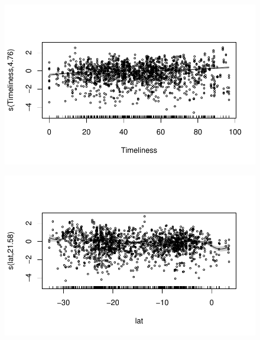 \documentclass[
  letterpaper,
  DIV=11,
  numbers=noendperiod]{scrartcl}
\begin{document}
\begin{figure}[H]

{\centering \includegraphics{Group34Coursework_files/figure-pdf/unnamed-chunk-16-8.pdf}

}

\end{figure}

\begin{figure}[H]

{\centering \includegraphics{Group34Coursework_files/figure-pdf/unnamed-chunk-16-9.pdf}

}

\end{figure}
\end{document}
